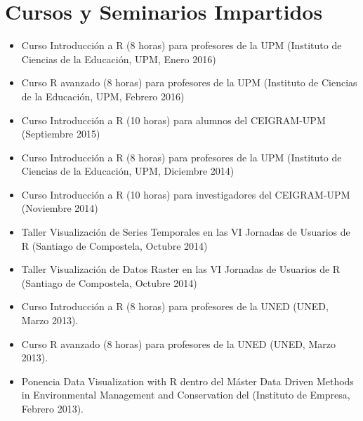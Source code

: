 \documentclass[article, a4paper]{memoir}
\begin{document}
\section{Cursos y Seminarios Impartidos}
\label{sec:org854790e}

\begin{itemize}
\item Curso \guillemotleft{}Introducción a R\guillemotright{} (8 horas) para profesores de la UPM (Instituto de Ciencias de la Educación, UPM, Enero 2016)

\item Curso \guillemotleft{}R avanzado\guillemotright{} (8 horas) para profesores de la UPM (Instituto de Ciencias de la Educación, UPM, Febrero 2016)

\item Curso \guillemotleft{}Introducción a R\guillemotright{} (10 horas) para alumnos del CEIGRAM-UPM (Septiembre 2015)

\item Curso \guillemotleft{}Introducción a R\guillemotright{} (8 horas) para profesores de la UPM (Instituto de Ciencias de la Educación, UPM, Diciembre 2014)

\item Curso \guillemotleft{}Introducción a R\guillemotright{} (10 horas) para investigadores del CEIGRAM-UPM (Noviembre 2014)

\item Taller \guillemotleft{}Visualización de Series Temporales\guillemotright{} en las VI Jornadas de Usuarios de R (Santiago de Compostela, Octubre 2014)

\item Taller \guillemotleft{}Visualización de Datos Raster\guillemotright{} en las VI Jornadas de Usuarios de R (Santiago de Compostela, Octubre 2014)

\item Curso \guillemotleft{}Introducción a R\guillemotright{} (8 horas) para profesores de la UNED (UNED, Marzo 2013).

\item Curso \guillemotleft{}R avanzado\guillemotright{} (8 horas) para profesores de la UNED (UNED, Marzo 2013).

\item Ponencia \guillemotleft{}Data Visualization with R\guillemotright{} dentro del Máster \guillemotleft{}Data Driven Methods in Environmental Management and Conservation\guillemotright{} del (Instituto de Empresa, Febrero 2013).


\end{itemize}
\end{document}
